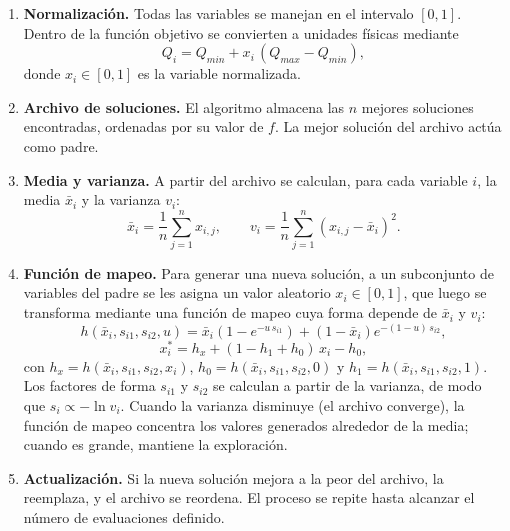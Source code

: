 \begin{enumerate}
    \item \textbf{Normalización.} Todas las variables se manejan en el intervalo $[0,1]$. Dentro de la función objetivo se convierten a unidades físicas mediante
    \begin{equation}
        Q_i = Q_{min} + x_i\,(Q_{max} - Q_{min}),
    \end{equation}
    donde $x_i \in [0,1]$ es la variable normalizada.

    \item \textbf{Archivo de soluciones.} El algoritmo almacena las $n$ mejores soluciones encontradas, ordenadas por su valor de $f$. La mejor solución del archivo actúa como padre.

    \item \textbf{Media y varianza.} A partir del archivo se calculan, para cada variable $i$, la media $\bar{x}_i$ y la varianza $v_i$:
    \begin{equation}
        \bar{x}_i = \frac{1}{n}\sum_{j=1}^{n} x_{i,j}, \qquad
        v_i = \frac{1}{n}\sum_{j=1}^{n} \left(x_{i,j} - \bar{x}_i\right)^2 .
    \end{equation}

    \item \textbf{Función de mapeo.} Para generar una nueva solución, a un subconjunto de variables del padre se les asigna un valor aleatorio $x_i \in [0,1]$, que luego se transforma mediante una función de mapeo cuya forma depende de $\bar{x}_i$ y $v_i$:
    \begin{equation}
        h(\bar{x}_i, s_{i1}, s_{i2}, u) = \bar{x}_i\left(1 - e^{-u\,s_{i1}}\right) + \left(1-\bar{x}_i\right) e^{-(1-u)\,s_{i2}},
    \end{equation}
    \begin{equation}
        x_i^{*} = h_x + (1 - h_1 + h_0)\,x_i - h_0,
    \end{equation}
    con $h_x = h(\bar{x}_i, s_{i1}, s_{i2}, x_i)$, $h_0 = h(\bar{x}_i, s_{i1}, s_{i2}, 0)$ y $h_1 = h(\bar{x}_i, s_{i1}, s_{i2}, 1)$. Los factores de forma $s_{i1}$ y $s_{i2}$ se calculan a partir de la varianza, de modo que $s_i \propto -\ln v_i$. Cuando la varianza disminuye (el archivo converge), la función de mapeo concentra los valores generados alrededor de la media; cuando es grande, mantiene la exploración.

    \item \textbf{Actualización.} Si la nueva solución mejora a la peor del archivo, la reemplaza, y el archivo se reordena. El proceso se repite hasta alcanzar el número de evaluaciones definido.
\end{enumerate}

